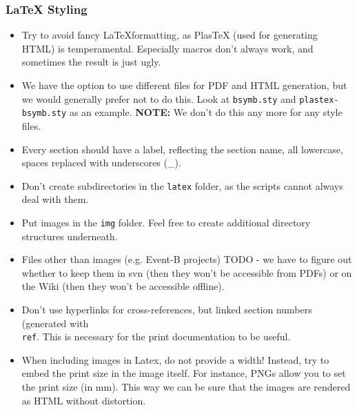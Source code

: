 \subsubsection{\LaTeX{} Styling}

\begin{itemize}
	\item Try to avoid fancy \LaTeX formatting, as PlasTeX (used for generating HTML) is temperamental.  Especially macros don't always work, and sometimes the result is just ugly.
	\item We have the option to use different files for PDF and HTML generation, but we would generally prefer not to do this.  Look at \texttt{bsymb.sty} and \texttt{plastex-bsymb.sty} as an example. \textbf{NOTE:} We don't do this any more for any style files.
	\item Every section should have a label, reflecting the section name, all lowercase, spaces replaced with underscores (\_).
	\item Don't create subdirectories in the \texttt{latex} folder, as the scripts cannot always deal with them.
	\item Put images in the \texttt{img} folder.  Feel free to create additional directory structures underneath.
	\item Files other than images (e.g. Event-B projects) TODO - we have to figure out whether to keep them in svn (then they won't be accessible from PDFs) or on the Wiki (then they won't be accessible offline).
	\item Don't use hyperlinks for cross-references, but linked section numbers (generated with \texttt{\\ref{}}.  This is necessary for the print documentation to be useful.
	\item When including images in Latex, do not provide a width!  Instead, try to embed the print size in the image itself.  For instance, PNGs allow you to set the print size (in mm).  This way we can be sure that the images are rendered as HTML without distortion.
\end{itemize}

